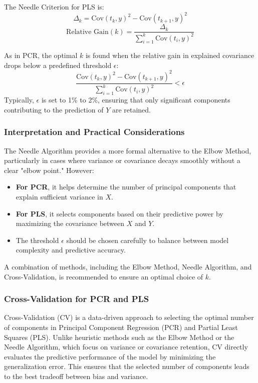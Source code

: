 \documentclass[11pt,twoside,a4paper]{article}
\begin{document}
The Needle Criterion for PLS is:
\begin{equation}
\Delta_k = \text{Cov}(t_k, y)^2 - \text{Cov}(t_{k+1}, y)^2
\end{equation}
\begin{equation}
\text{Relative Gain}(k) = \frac{\Delta_k}{\sum_{i=1}^{k} \text{Cov}(t_i, y)^2}
\end{equation}

As in PCR, the optimal \( k \) is found when the relative gain in explained covariance drops below a predefined threshold \( \epsilon \):
\begin{equation}
\frac{\text{Cov}(t_k, y)^2 - \text{Cov}(t_{k+1}, y)^2}{\sum_{i=1}^{k} \text{Cov}(t_i, y)^2} < \epsilon
\end{equation}
Typically, \( \epsilon \) is set to 1\% to 2\%, ensuring that only significant components contributing to the prediction of \( Y \) are retained.

\subsubsection{Interpretation and Practical Considerations}
The Needle Algorithm provides a more formal alternative to the Elbow Method, particularly in cases where variance or covariance decays smoothly without a clear "elbow point." However:
\begin{itemize}
    \item \textbf{For PCR}, it helps determine the number of principal components that explain sufficient variance in \( X \).
    \item \textbf{For PLS}, it selects components based on their predictive power by maximizing the covariance between \( X \) and \( Y \).
    \item The threshold \( \epsilon \) should be chosen carefully to balance between model complexity and predictive accuracy.
\end{itemize}
A combination of methods, including the Elbow Method, Needle Algorithm, and Cross-Validation, is recommended to ensure an optimal choice of \( k \).
\subsubsection{Cross-Validation for PCR and PLS}
Cross-Validation (CV) is a data-driven approach to selecting the optimal number of components in Principal Component Regression (PCR) and Partial Least Squares (PLS). Unlike heuristic methods such as the Elbow Method or the Needle Algorithm, which focus on variance or covariance retention, CV directly evaluates the predictive performance of the model by minimizing the generalization error. This ensures that the selected number of components leads to the best tradeoff between bias and variance.
\end{document}
